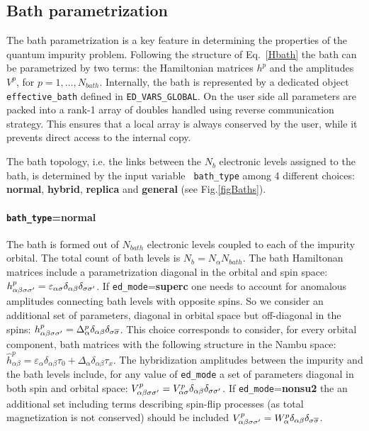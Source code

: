 \documentclass[final,3p,10pt]{elsarticle}
\def\a{\alpha}       \def\b{\beta}   \def\g{\gamma}   \def\d{\delta}
\def\e{\varepsilon}  \def\z{\zeta}   \def\h{\eta}     \def\th{\theta}
\begin{document}
\subsection{Bath parametrization}\label{sSecBath}
The bath parametrization is a key feature in determining the properties
of the quantum impurity problem.
Following the structure of Eq.~\ref{Hbath} the bath can be
parametrized by two terms: the Hamiltonian matrices $h^p$ and the
amplitudes $V^p$, for $p=1,\dots,N_{bath}$.
Internally, the bath is represented by a dedicated object {\tt
  effective\_bath} defined in {\tt ED\_VARS\_GLOBAL}. 
On the
user side all parameters are packed into a rank-1 array of
doubles handled using reverse communication strategy.
This ensures that a local array is always conserved by the user, while
it prevents direct access to the internal copy.


The bath topology, i.e. the links between the $N_b$ electronic levels
assigned to the bath, is determined by the input variable {\tt
  bath\_type} among 4 different choices: {\bf normal}, {\bf hybrid},
{\bf replica} and {\bf general} (see Fig.\ref{figBaths}).  
%
\paragraph{{\tt bath\_type}={\bf normal}} The bath is formed out of $N_{bath}$
electronic levels coupled to each of the impurity orbital. The total
count of bath levels is $N_b = N_\a N_{bath}$. The bath Hamiltonan
matrices include a parametrization diagonal in the orbital and spin space: 
$h^p_{\a\b\s\s'}=\varepsilon_{\a\s}\delta_{\a\b}\delta_{\s\s'}$.
If {\tt ed\_mode}={\bf superc} one needs to account for anomalous
amplitudes connecting bath levels with opposite spins. So we consider
an additional set of parameters, diagonal in orbital space but
off-diagonal in the spins:
$h^p_{\a\b\s\s'}=\Delta^p_{\a}\delta_{\a\b}\delta_{\s \overline{\s}}$.
This choice corresponds to consider, for every orbital component,
bath matrices with the following structure in the Nambu space:
$\hat{h}^p_{\a\b} = \e_{\a}\delta_{\a\b}\tau_0 +
\Delta_{\a}\delta_{\a\b}\tau_x$. 
The hybridization amplitudes between the impurity and the bath levels
include, for any value of {\tt ed\_mode} a set of parameters diagonal in both
spin and orbital space: $V^p_{\a\b\s\s'}=V^p_{\a\s}\delta_{\a\b}\delta_{\s\s'}$.
If {\tt ed\_mode}={\bf nonsu2} the an additional set including terms
describing spin-flip processes (as total magnetization is not
conserved) should be included $V^p_{\a\b\s\s'} =
W^p_{\a}\delta_{\a\b}\delta_{\s \overline{\s}}$. 
\end{document}
